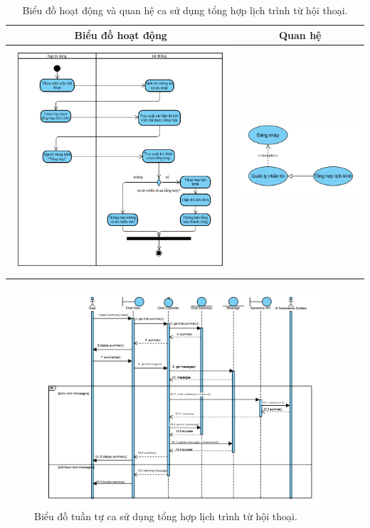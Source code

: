 \begin{table}[H] %
    \centering
    \caption{Biểu đồ hoạt động và quan hệ ca sử dụng tổng hợp lịch trình từ hội thoại.} %
    \label{tab:uc_summarize_itinerary_diagrams} %
    \begin{tabular}{| c | c |}
        \hline
        \textbf{Biểu đồ hoạt động} & \textbf{Quan hệ} \\
        \hline
        \includegraphics[width=0.5\linewidth]{figures/c3/3-3-10-ad.png} %
        &
        \includegraphics[width=0.45\linewidth]{figures/c3/3-3-10-rd.png} \\ %
        \hline
    \end{tabular}
\end{table}

\begin{figure}[H]
    \centering
    \includegraphics[width=0.95\textwidth]{figures/c3/3-3-10-sd.png} %
    \caption{Biểu đồ tuần tự ca sử dụng tổng hợp lịch trình từ hội thoại.}
    \label{fig:3-3-10-sequence-diagram}
\end{figure}